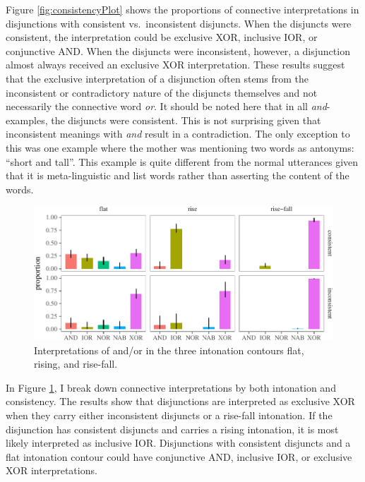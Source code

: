\documentclass[oneside]{report}
\theoremstyle{definition}
\theoremstyle{definition}
\theoremstyle{definition}
\theoremstyle{remark}
\begin{document}
Figure \ref{fig:consistencyPlot} shows the proportions of connective
interpretations in disjunctions with consistent vs.~inconsistent
disjuncts. When the disjuncts were consistent, the interpretation could
be exclusive XOR, inclusive IOR, or conjunctive AND. When the disjuncts
were inconsistent, however, a disjunction almost always received an
exclusive XOR interpretation. These results suggest that the exclusive
interpretation of a disjunction often stems from the inconsistent or
contradictory nature of the disjuncts themselves and not necessarily the
connective word \emph{or}. It should be noted here that in all
\emph{and}-examples, the disjuncts were consistent. This is not
surprising given that inconsistent meanings with \emph{and} result in a
contradiction. The only exception to this was one example where the
mother was mentioning two words as antonyms: ``short and tall''. This
example is quite different from the normal utterances given that it is
meta-linguistic and list words rather than asserting the content of the
words.
\begin{figure}[tb]

{\centering \includegraphics{figs/consistencyByintonationPlot-1} 

}

\caption{Interpretations of and/or in the three intonation contours flat, rising, and rise-fall.}\label{fig:consistencyByintonationPlot}
\end{figure}
In Figure \ref{fig:consistencyByintonationPlot}, I break down connective
interpretations by both intonation and consistency. The results show
that disjunctions are interpreted as exclusive XOR when they carry
either inconsistent disjuncts or a rise-fall intonation. If the
disjunction has consistent disjuncts and carries a rising intonation, it
is most likely interpreted as inclusive IOR. Disjunctions with
consistent disjuncts and a flat intonation contour could have
conjunctive AND, inclusive IOR, or exclusive XOR interpretations.
\end{document}
